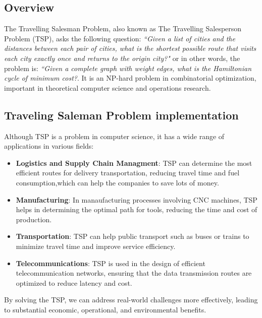 \documentclass[a4paper]{article}
\begin{document}
\subsection{Overview}
The Travelling Salesman Problem, also known as The Travelling Salesperson Problem (TSP), asks the following question: \textit{``Given a list of cities and the distances between each pair of cities, what is the shortest possible route that visits each city exactly once and returns to the origin city?"} or in other words, the problem is: \textit{``Given a complete graph with weight edges, what is the Hamiltonian cycle of minimum cost?}. It is an NP-hard problem in combinatorial optimization, important in theoretical computer science and operations research.
\subsection{Traveling Saleman Problem implementation}
Although TSP is a problem in computer science, it has a wide range of applications in various fields:
\begin{itemize}
    \item \textbf{Logistics and Supply Chain Managment}: TSP can determine the most efficient routes for delivery transportation, reducing travel time and fuel consumption,which can help the companies to save lots of money.
    \item \textbf{Manufacturing}: In manaufacturing processes involving CNC machines, TSP helps in determining the optimal path for tools, reducing the time and cost of production.
    \item \textbf{Transportation}: TSP can help public transport such as buses or trains to minimize travel time and improve service efficiency.
    \item \textbf{Telecommunications}: TSP is used in the design of efficient telecommunication networks, ensuring that the data transmission routes are optimized to reduce latency and cost.
\end{itemize}
By solving the TSP, we can address real-world challenges more effectively, leading to substantial economic, operational, and environmental benefits.
\end{document}
